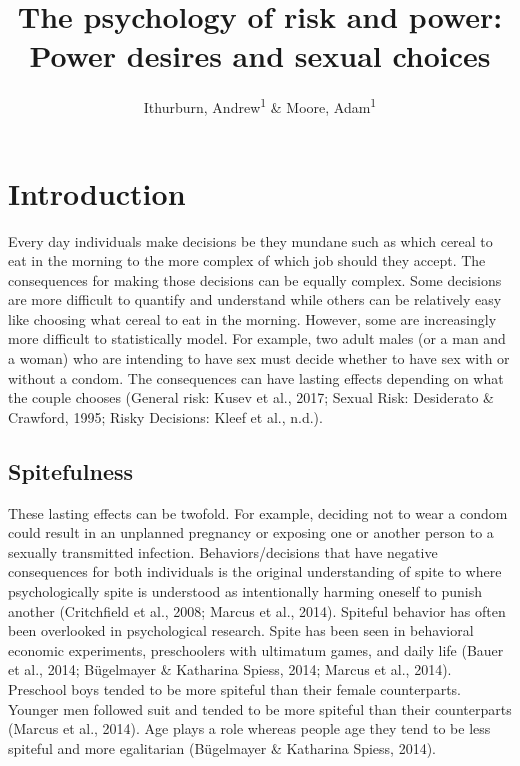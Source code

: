 \documentclass[
  english,
  a4paper,floatsintext]{apa7}
\title{The psychology of risk and power: Power desires and sexual choices}
\author{Ithurburn, Andrew\textsuperscript{1} \& Moore, Adam\textsuperscript{1}}
\date{}
\affiliation{\vspace{0.5cm}\textsuperscript{1} The University of Edinburgh}
\begin{document}
\maketitle

\hypertarget{introduction}{%
\section{Introduction}\label{introduction}}

Every day individuals make decisions be they mundane such as which cereal to eat in the morning to the more complex of which job should they accept. The consequences for making those decisions can be equally complex. Some decisions are more difficult to quantify and understand while others can be relatively easy like choosing what cereal to eat in the morning. However, some are increasingly more difficult to statistically model. For example, two adult males (or a man and a woman) who are intending to have sex must decide whether to have sex with or without a condom. The consequences can have lasting effects depending on what the couple chooses (General risk: Kusev et al., 2017; Sexual Risk: Desiderato \& Crawford, 1995; Risky Decisions: Kleef et al., n.d.).

\hypertarget{spitefulness}{%
\subsection{Spitefulness}\label{spitefulness}}

These lasting effects can be twofold. For example, deciding not to wear a condom could result in an unplanned pregnancy or exposing one or another person to a sexually transmitted infection. Behaviors/decisions that have negative consequences for both individuals is the original understanding of spite to where psychologically spite is understood as intentionally harming oneself to punish another (Critchfield et al., 2008; Marcus et al., 2014). Spiteful behavior has often been overlooked in psychological research. Spite has been seen in behavioral economic experiments, preschoolers with ultimatum games, and daily life (Bauer et al., 2014; Bügelmayer \& Katharina Spiess, 2014; Marcus et al., 2014). Preschool boys tended to be more spiteful than their female counterparts. Younger men followed suit and tended to be more spiteful than their counterparts (Marcus et al., 2014). Age plays a role whereas people age they tend to be less spiteful and more egalitarian (Bügelmayer \& Katharina Spiess, 2014).
\end{document}
